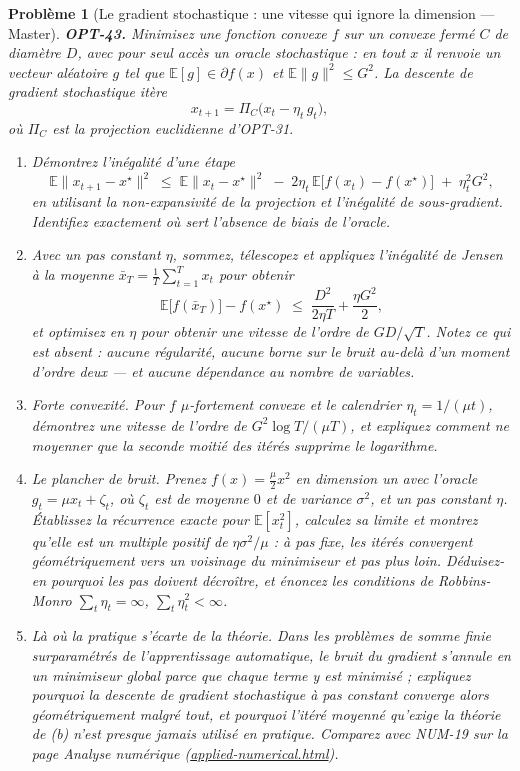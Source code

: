 \documentclass[11pt]{article}
\newtheorem{problem}{Problème}
\begin{document}
\begin{problem}[{Le gradient stochastique : une vitesse qui ignore la dimension --- Master}]
\textbf{OPT-43.} Minimisez une fonction convexe $f$ sur un convexe fermé $C$ de diamètre $D$, avec pour seul accès un oracle stochastique : en tout $x$ il renvoie un vecteur aléatoire $g$ tel que $\mathbb{E}[g] \in \partial f(x)$ et $\mathbb{E}\|g\|^2 \le G^2$. La descente de gradient stochastique itère
\[ x_{t+1} = \Pi_C\big(x_t - \eta_t\, g_t\big), \]
où $\Pi_C$ est la projection euclidienne d'OPT-31.
\begin{enumerate}
\item[(a)] Démontrez l'inégalité d'une étape
\[ \mathbb{E}\|x_{t+1} - x^\star\|^2 \;\le\; \mathbb{E}\|x_t - x^\star\|^2 \;-\; 2\eta_t\,\mathbb{E}\big[f(x_t) - f(x^\star)\big] \;+\; \eta_t^2 G^2, \]
en utilisant la non-expansivité de la projection et l'inégalité de sous-gradient. Identifiez exactement où sert l'absence de biais de l'oracle.
\item[(b)] Avec un pas constant $\eta$, sommez, télescopez et appliquez l'inégalité de Jensen à la moyenne $\bar{x}_T = \tfrac{1}{T}\sum_{t=1}^{T} x_t$ pour obtenir
\[ \mathbb{E}\big[f(\bar{x}_T)\big] - f(x^\star) \;\le\; \frac{D^2}{2\eta T} + \frac{\eta G^2}{2}, \]
et optimisez en $\eta$ pour obtenir une vitesse de l'ordre de $GD/\sqrt{T}$. Notez ce qui est absent : aucune régularité, aucune borne sur le bruit au-delà d'un moment d'ordre deux --- et aucune dépendance au nombre de variables.
\item[(c)] Forte convexité. Pour $f$ $\mu$-fortement convexe et le calendrier $\eta_t = 1/(\mu t)$, démontrez une vitesse de l'ordre de $G^2 \log T/(\mu T)$, et expliquez comment ne moyenner que la seconde moitié des itérés supprime le logarithme.
\item[(d)] Le plancher de bruit. Prenez $f(x) = \tfrac{\mu}{2}x^2$ en dimension un avec l'oracle $g_t = \mu x_t + \zeta_t$, où $\zeta_t$ est de moyenne $0$ et de variance $\sigma^2$, et un pas constant $\eta$. Établissez la récurrence exacte pour $\mathbb{E}[x_t^2]$, calculez sa limite et montrez qu'elle est un multiple positif de $\eta\sigma^2/\mu$ : à pas fixe, les itérés convergent géométriquement vers un \textit{voisinage} du minimiseur et pas plus loin. Déduisez-en pourquoi les pas doivent décroître, et énoncez les conditions de Robbins-Monro $\sum_t \eta_t = \infty$, $\sum_t \eta_t^2 < \infty$.
\item[(e)] Là où la pratique s'écarte de la théorie. Dans les problèmes de somme finie surparamétrés de l'apprentissage automatique, le bruit du gradient s'annule en un minimiseur global parce que chaque terme y est minimisé ; expliquez pourquoi la descente de gradient stochastique à pas constant converge alors géométriquement malgré tout, et pourquoi l'itéré moyenné qu'exige la théorie de (b) n'est presque jamais utilisé en pratique. Comparez avec NUM-19 sur la page Analyse numérique (\url{applied-numerical.html}).
\end{enumerate}

\end{problem}
\end{document}
